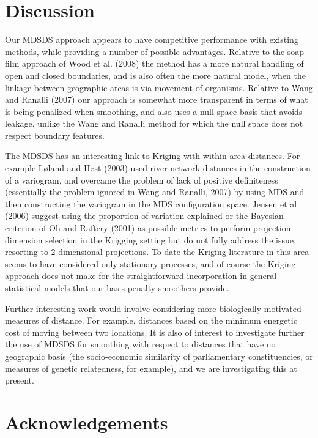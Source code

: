 \documentclass[useAMS, referee]{biom}
\begin{document}
\section{Discussion}
\label{conclusion}

Our MDSDS approach appears to have competitive performance with existing methods, while providing a number of possible advantages. Relative to the soap film approach of Wood et al. (2008) the method has a more natural handling of open and closed boundaries, and is also often the more natural model, when the linkage between geographic areas is via movement of organisms. Relative to Wang and Ranalli (2007) our approach is somewhat more transparent in terms of what is being penalized when smoothing, and also uses a null space basis that avoids leakage, unlike the Wang and Ranalli method for which the null space does not respect boundary features. 

The MDSDS has an interesting link to Kriging with within area distances. For example L{\o}land and H{\o}st (2003) used river network distances in the construction of a variogram, and overcame the problem of lack of positive definiteness (essentially the problem ignored in Wang and Ranalli, 2007) by using MDS and then constructing the variogram in the MDS configuration space. Jensen et al (2006) suggest using the proportion of variation explained or the Bayesian criterion of Oh and Raftery (2001) as possible metrics to perform projection dimension selection in the Krigging setting but do not fully address the issue, resorting to 2-dimensional projections. To date the Kriging literature in this area seems to have considered only stationary processes, and of course the Kriging approach does not make for the straightforward incorporation in general statistical models that our basis-penalty smoothers provide. 

Further interesting work would involve considering more biologically motivated measures of distance. For example, distances based on the minimum energetic cost of moving between  two locations. It is also of interest to investigate further the use of MDSDS for smoothing with respect to distances that have no geographic basis (the socio-economic similarity of parliamentary constituencies, or measures of genetic relatedness, for example), and we are investigating this at present.



\section*{Acknowledgements}
\end{document}
